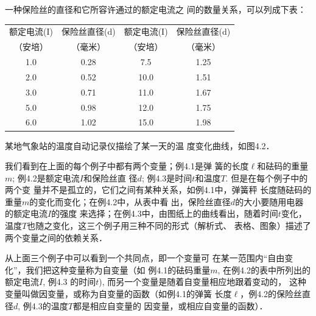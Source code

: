 \begin{example}
    一种保险丝的直径和它所容许通过的额定电流之
    间的数量关系，可以列成下表：
\begin{center}
\begin{tabular}{cccc}
    \hline
    额定电流(I)  &  保险丝直径(d)  &  额定电流(I) &  保险丝直径(d)\\
（安培）  &  （毫米）  &  （安培）  &  （毫米）  \\
\hline
1.0  &  0.28  &  7.5  &  1.25\\
2.0  &  0.52  &  10.0  &  1.51\\
3.0  &  0.71  &  11.0  &  1.67\\
5.0  &  0.98  &  12.0  &  1.75  \\
6.0  &  1.02  &  15.0  &  1.98\\
\hline
\end{tabular}
\end{center}


\end{example}

\begin{example}
    某地气象站的温度自动记录仪描绘了某一天的温
    度变化曲线，如图4.2．
\end{example}

\begin{figure}[htp]
    \centering
{}
    \caption{}
\end{figure}


我们看到在上面的每个例子中都有两个变量；例4.1是弹
簧的长度$\ell$和砝码的重量$m$; 例4.2是额定电流$I$和保险丝直
径$d$; 例4.3是时间$t$和温度$T$. 但是在每个例子中的两个变
量并不是孤立的，它们之间有某种关系，如例4.1中，弹簧秤
长度随砝码的重量$m$的变化而变化；在例4.2中，从表中看
出，保险丝直径$d$的大小要随用电器的额定电流$I$的强度
来选择；在例4.3中，由图纸上的曲线看出，随着时间$t$变化，
温度$T$也随之变化，这三个例子用三种不同的形式（解析式、
表格、图象）描述了两个变量之间的依赖关系．

从上面三个例子中可以看到一个共同点，即一个变量可
在某一范围内“自由变化”，我们把这种变量称为自变量（如
例4.1的砝码重量$m$, 在例4.2的表中所列出的额定电流$I$, 例4.3
的时间$t$), 而另一个变量是随着自变量相应地跟着变动的，
这种变量叫做因变量，或称为自变量的函数（如例4.1的弹簧
长度$\ell$，例4.2的保险丝直径$d$, 例4.3的温度$T$都是相应自变量的
因变量，或相应自变量的函数）．

